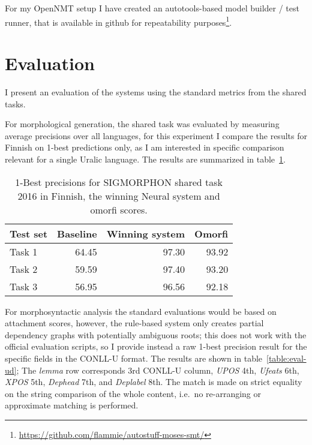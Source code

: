 \documentclass{flammie}
\begin{document}
For my OpenNMT setup I have created an autotools-based model builder / test
runner, that is available in github for repeatability
purposes\footnote{\url{https://github.com/flammie/autostuff-moses-smt/}}.

\section{Evaluation}
\label{sec:evaluation}

I present an evaluation of the systems using the standard metrics from the
shared tasks.

For morphological generation, the shared task was evaluated by measuring average
precisions over all languages, for this experiment I compare the results for
Finnish on 1-best predictions only, as I am interested in specific comparison
relevant for a single Uralic language. The results are summarized in
table~\ref{table:eval-sigmorphon}.

\begin{table}
\begin{centering}
    \begin{tabular}{lrrr}
        \toprule
        Test set & \bf Baseline & \bf Winning system & \bf Omorfi \\
        \midrule
        Task 1 & 64.45 & 97.30 & 93.92 \\
        Task 2 & 59.59 & 97.40 & 93.20 \\
        Task 3 & 56.95 & 96.56 & 92.18 \\
        \bottomrule
    \end{tabular}
    \caption{1-Best precisions for SIGMORPHON shared task 2016 in Finnish,
    the winning Neural system and omorfi scores.
\label{table:eval-sigmorphon}}
\end{centering}
\end{table}

For morphosyntactic analysis the standard evaluations would be based on
attachment scores, however, the rule-based system only creates partial
dependency graphs with potentially ambiguous roots; this does not work with
the official evaluation scripts, so I provide instead a raw 1-best precision
result for the specific fields in the CONLL-U format. The results
are shown in table~\ref{table:eval-ud}; The \textit{lemma} row corresponds
3rd CONLL-U column, \textit{UPOS} 4th, \textit{Ufeats} 6th, \textit{XPOS} 5th,
\textit{Dephead} 7th, and \textit{Deplabel} 8th. The match is made on strict
equality on the string comparison of the whole content, i.e.\ no re-arranging or
approximate matching is performed.
\end{document}

